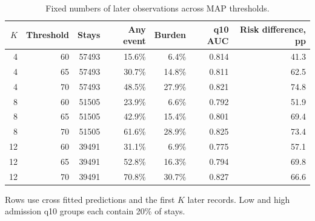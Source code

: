\begin{table}[!htbp]
\caption{Fixed numbers of later observations across MAP thresholds.}
\label{tab:fixed_opportunity_threshold_sensitivity}
\centering
\scriptsize
\begin{tabular}{rrrrrrr}
\hline
$K$ & Threshold & Stays & Any event & Burden & q10 AUC & Risk difference, pp\\
\hline
4 & 60 & 57493 & 15.6\% & 6.4\% & 0.814 & 41.3\\
4 & 65 & 57493 & 30.7\% & 14.8\% & 0.811 & 62.5\\
4 & 70 & 57493 & 48.5\% & 27.9\% & 0.821 & 74.8\\
8 & 60 & 51505 & 23.9\% & 6.6\% & 0.792 & 51.9\\
8 & 65 & 51505 & 42.9\% & 15.4\% & 0.801 & 69.4\\
8 & 70 & 51505 & 61.6\% & 28.9\% & 0.825 & 73.4\\
12 & 60 & 39491 & 31.1\% & 6.9\% & 0.775 & 57.1\\
12 & 65 & 39491 & 52.8\% & 16.3\% & 0.794 & 69.8\\
12 & 70 & 39491 & 70.8\% & 30.7\% & 0.827 & 66.6\\
\hline
\end{tabular}
\par\smallskip
\footnotesize{Rows use cross fitted predictions and the first $K$ later records. Low and high admission q10 groups each contain 20\% of stays.}
\end{table}
